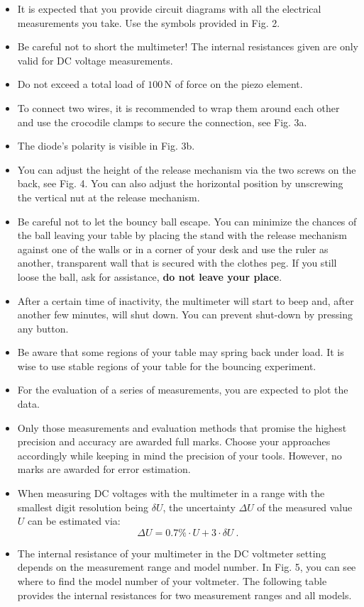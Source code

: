 \begin{itemize}
\item It is expected that you provide circuit diagrams with all the electrical
measurements you take. Use the symbols provided in Fig. 2.
\item Be careful not to short the multimeter! The internal resistances given
are only valid for DC voltage measurements.
\item Do not exceed a total load of $100\,\mathrm{N}$ of force on the piezo
element.
\item To connect two wires, it is recommended to wrap them around each other
and use the crocodile clamps to secure the connection, see Fig. 3a.
\item The diode's polarity is visible in Fig. 3b.
\item You can adjust the height of the release mechanism via the two screws on
the back, see Fig. 4. You can also adjust the horizontal position by
unscrewing the vertical nut at the release mechanism.
\item Be careful not to let the bouncy ball escape. You can minimize the chances
of the ball leaving your table by placing the stand with the release mechanism
against one of the walls or in a corner of your desk and use the ruler as
another, transparent wall that is secured with the clothes peg. If you still
loose the ball, ask for assistance, \textbf{do not leave your place}.
\item After a certain time of inactivity, the multimeter will start to beep
and, after another few minutes, will shut down. You can prevent shut-down by
pressing any button.
\item Be aware that some regions of your table may spring back under load. It
is wise to use stable regions of your table for the bouncing experiment.
\item For the evaluation of a series of measurements, you are expected to plot
the data.
\item Only those measurements and evaluation methods that promise the highest
precision and accuracy are awarded full marks. Choose your approaches
accordingly while keeping in mind the precision of your tools. However, no
marks are awarded for error estimation.
\item When measuring DC voltages with the multimeter in a range with the
smallest digit resolution being $\delta U$, the uncertainty $\Delta U$ of the
measured value $U$ can be estimated via:
\begin{equation}
\Delta U = 0.7\% \cdot U + 3 \cdot \delta U \ . \tag{3}
\end{equation}
\item The internal resistance of your multimeter in the DC voltmeter setting
depends on the measurement range and model number. In Fig. 5, you can see
where to find the model number of your voltmeter. The following table provides
the internal resistances for two measurement ranges and all models.
\end{itemize}

